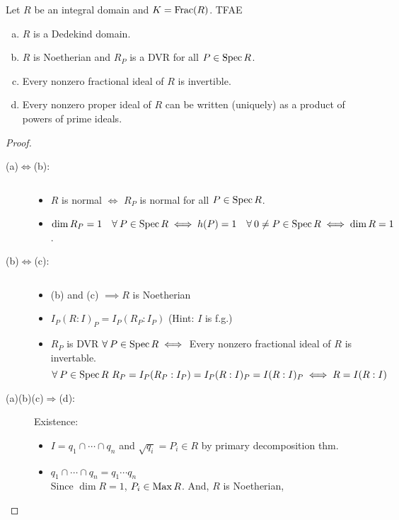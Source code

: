 \begin{theorem}
  Let $R$ be an integral domain and $K= \operatorname{Frac}(R)$. TFAE
  \begin{enumerate}[(a)]
    \item $R$ is a Dedekind domain.
    \item $R$ is Noetherian and $R_P$ is a DVR for all $P \in \operatorname{Spec} R$.
    \item Every nonzero fractional ideal of $R$ is invertible.
    \item Every nonzero proper ideal of $R$ can be written (uniquely) as a
      product of powers of prime ideals.
  \end{enumerate}

  \begin{proof} \mbox{}
    \begin{description}
      \item[\rm (a)$\Leftrightarrow$(b):] $ $
        \begin{itemize}
          \item $R$ is normal $\iff$ $R_P$ is normal for all $P \in \operatorname{Spec} R$.
          \item $\dim R_P = 1 \quad \forall P \in \Spec R \iff h(P) = 1 \quad
            \forall 0 \ne P \in \Spec R \iff \dim R = 1$.
        \end{itemize}
      \item[\rm (b)$\Leftrightarrow$(c):] $ $
        \begin{itemize}
          \item (b) and (c) $\implies R$ is Noetherian
          \item $I_P(R:I)_P = I_P(R_P:I_P)$ (Hint: $I$ is f.g.)
          \item $R_P$ is DVR $\forall P \in \Spec R \iff$ Every nonzero fractional
            ideal of $R$ is invertable.
            $$
            \forall P \in \Spec R\ R_P = I_P(R_P:I_P) = I_P(R:I)_P
             = I(R:I)_P \iff R = I(R:I)
            $$
        \end{itemize}
      \item[\rm (a)(b)(c)$\Rightarrow$(d):] $ $ \\
        Existence:
        \begin{itemize} 
          \item $I = q_1 \cap \cdots \cap q_n$ and $\sqrt{q_i} = P_i \in R $ by
             primary decomposition thm.
          \item $q_1 \cap \cdots \cap q_n = q_1 \cdots q_n$ \\
            Since $\dim R = 1$, $P_i \in \operatorname{Max} R$. And, $R$ is Noetherian,

\end{itemize}
\end{description}
\end{proof}
\end{theorem}
